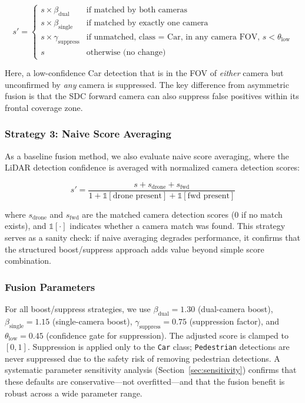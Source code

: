 \documentclass[sustainability,article,submit,moreauthors,pdftex]{Definitions/mdpi}
\begin{document}
\begin{equation}\label{eq:symmetric_rules}
s' = \begin{cases}
s \times \beta_{\mathrm{dual}} & \text{if matched by both cameras} \\
s \times \beta_{\mathrm{single}} & \text{if matched by exactly one camera} \\
s \times \gamma_{\mathrm{suppress}} & \text{if unmatched, class = Car, in any camera FOV, } s < \theta_{\mathrm{low}} \\
s & \text{otherwise (no change)}
\end{cases}
\end{equation}

\noindent Here, a low-confidence Car detection that is in the FOV of \emph{either} camera but unconfirmed by \emph{any} camera is suppressed. The key difference from asymmetric fusion is that the SDC forward camera can also suppress false positives within its frontal coverage zone.

\subsubsection{Strategy 3: Naive Score Averaging}\label{sec:naive}

As a baseline fusion method, we also evaluate naive score averaging, where the LiDAR detection confidence is averaged with normalized camera detection scores:

\begin{equation}\label{eq:naive_rules}
s' = \frac{s + s_{\mathrm{drone}} + s_{\mathrm{fwd}}}{1 + \mathbb{1}[\text{drone present}] + \mathbb{1}[\text{fwd present}]}
\end{equation}

\noindent where $s_{\mathrm{drone}}$ and $s_{\mathrm{fwd}}$ are the matched camera detection scores (0 if no match exists), and $\mathbb{1}[\cdot]$ indicates whether a camera match was found. This strategy serves as a sanity check: if naive averaging degrades performance, it confirms that the structured boost/suppress approach adds value beyond simple score combination.

\subsubsection{Fusion Parameters}

For all boost/suppress strategies, we use $\beta_{\mathrm{dual}} = 1.30$ (dual-camera boost), $\beta_{\mathrm{single}} = 1.15$ (single-camera boost), $\gamma_{\mathrm{suppress}} = 0.75$ (suppression factor), and $\theta_{\mathrm{low}} = 0.45$ (confidence gate for suppression). The adjusted score is clamped to $[0, 1]$. Suppression is applied only to the \texttt{Car} class; \texttt{Pedestrian} detections are never suppressed due to the safety risk of removing pedestrian detections.  A systematic parameter sensitivity analysis (Section~\ref{sec:sensitivity}) confirms that these defaults are conservative---not overfitted---and that the fusion benefit is robust across a wide parameter range.
\end{document}
